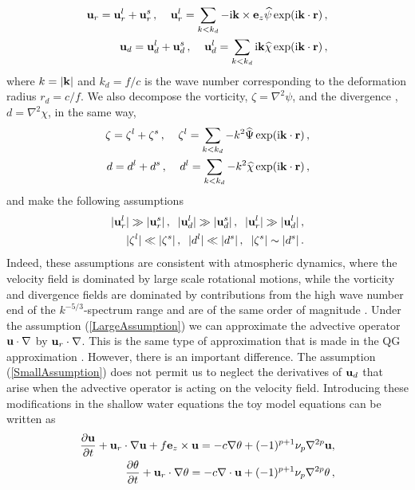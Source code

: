 \begin{eqnarray}
{\bf u}_r = {\bf u}_r^{l} + {\bf u}_r^{s} \, , \;\;\;\; 
{\bf u}_r^{l} = \sum_{k < k_{d}} -{\mbox{i}} {\bf k} \times {\bf e}_z \widehat{\psi}  \exp({\mbox{i}}{\bf k}\cdot {\bf r}) \, , \\
{\bf u}_d = {\bf u}_d^{l} + {\bf u}_d^{s} \, , \;\;\;\; 
{\bf u}_d^{l} = \sum_{k < k_{d}} {\mbox{i}} {\bf k} \widehat{\chi}  \exp({\mbox{i}}{\bf k}\cdot {\bf r}) \, ,
\end{eqnarray} 
where $ k = |{\bf k} | $ and $ k_d = f/c $ is the wave number corresponding to the deformation radius $ r_d = c/f $.  We also decompose the vorticity, $ \zeta = \nabla^{2} \psi $, and the divergence , $ d = \nabla^2 \chi $, in the same way, 
\begin{eqnarray}
\zeta = \zeta^l + \zeta^s \, , \;\;\;\;  \zeta ^{l} = \sum_{k < k_{d}} -k^2 \widehat{\Psi} \exp({\mbox{i}}{\bf k}\cdot {\bf r}) \, , \\
d = d^l + d^s \, , \;\;\;\;  d ^{l} = \sum_{k < k_{d}} -k^2 \widehat{\chi} \exp({\mbox{i}}{\bf k}\cdot {\bf r}) \, , 
\end{eqnarray} 
and make the following assumptions  
\begin{eqnarray} \label{LargeAssumption}
 | {\bf u}_r^{l} | \gg  | {\bf u}_r ^{s} | \, , \;\; | {\bf u}_d^{l} | \gg  | {\bf u}_d ^{s} | \, , \;\; 
 | {\bf u}_r^{l} | \gg | {\bf u}_d^{l} | \, , \\  \label{SmallAssumption} 
 | \zeta^{l} | \ll | \zeta^{s} | \, , \;\;   | d^{l} | \ll | d^{s} | \, , \;\; 
 | \zeta^{s} | \sim | d^{s} | \, .
\end{eqnarray}
Indeed, these assumptions are consistent with atmospheric dynamics, where the velocity field is dominated by large scale rotational motions, while the vorticity and divergence fields are dominated by contributions from the high wave number end of the $ k^{-5/3} $-spectrum range and are of the same order of magnitude 
\citep{Lindborg:2015}. 
Under the assumption (\ref{LargeAssumption})   we can approximate the advective operator $ {\bf u} \cdot \nabla $ by 
$ {\bf u}_r \cdot \nabla $. This is the same type of approximation that is made in the QG approximation \citep{Charney1971}.
However, there is an important difference. The assumption (\ref{SmallAssumption}) does not permit us to neglect the derivatives of $ {\bf u}_d $ that arise when the advective operator is acting on the velocity field.  
Introducing these modifications in the shallow water equations the toy model equations can be written as 
\begin{eqnarray} \label{V2}
\frac{\partial {\bf u}} {\partial t} + {\bf u}_r \cdot \nabla {\bf u} + f {\bf e}_z \times {\bf u} = -c \nabla \theta + (-1)^{p+1} \nu_p \nabla^{2p} {\bf u} , \\ \label{Theta}
\frac{\partial \theta}{\partial t}
+ {\bf u}_r \cdot \nabla \theta   = -  c\nabla \cdot {\bf u} + (-1)^{p+1} \nu_p \nabla^{2p} {\theta}\, ,
\end{eqnarray}
